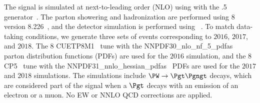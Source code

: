 \documentclass[11pt,twoside,a4paper,cmspaper]{cms-tdr}
\begin{document}
The signal is simulated at next-to-leading order (NLO) using with the .5 generator~\cite{MGatNLO}. The parton showering and hadronization are performed using {\PYTHIA}8 version 8.226~\cite{Sjostrand:2014zea}, and the detector simulation is performed using \GEANTfour~\cite{AGOSTINELLI2003250}. To match data-taking conditions, we generate three sets of events corresponding to $2016$, $2017$, and $2018$. The {\PYTHIA}8 CUETP8M1~\cite{Khachatryan:2015pea} tune with the NNPDF30\_nlo\_nf\_5\_pdfas~\cite{Ball_2015} parton distribution functions (PDFs) are used for the $2016$ simulation, and the {\PYTHIA}8 CP5~\cite{Sirunyan:2019dfx} tune with the NNPDF31\_nnlo\_hessian\_pdfas~\cite{collaboration2017parton} PDFs are used for the $2017$ and $2018$ simulations. The simulations include $\PW \to \Pgt \Pgngt$ decays, which are considered part of the signal when a $\Pgt$ decays with an emission of an electron or a muon. No EW or NNLO QCD corrections are applied.
\end{document}

